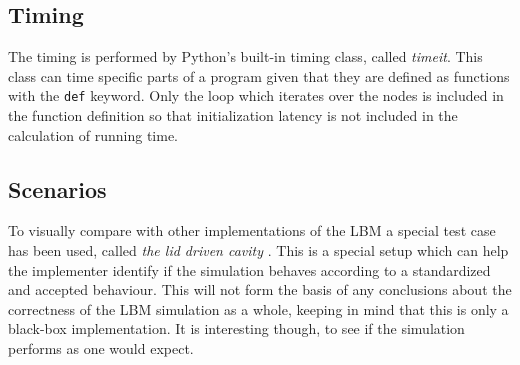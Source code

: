 \subsection{Timing}
The timing is performed by Python's built-in timing class, called \textit{timeit}. This class can time specific parts of a program given that they are defined as functions with the \texttt{def} keyword. Only the loop which iterates over the nodes is included in the function definition so that initialization latency is not included in the calculation of running time.

\subsection{Scenarios}
To visually compare with other implementations of the LBM a special test case has been used, called \emph{the lid driven cavity} \cite{lid}. This is a special setup which can help the implementer identify if the simulation behaves according to a standardized and accepted behaviour. This will not form the basis of any conclusions about the correctness of the LBM simulation as a whole, keeping in mind that this is only a black-box implementation. It is interesting though, to see if the simulation performs as one would expect.